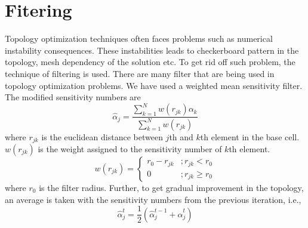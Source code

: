 \documentclass[openright,twoside]{iitkthesis}
\begin{document}
\section{Fitering}
Topology optimization techniques often faces problems such as numerical instability consequences. These instabilities leads to checkerboard pattern in the topology, mesh dependency of the solution etc. To get rid off such problem, the technique of filtering is used. There are many filter that are being used in topology optimization problems. We have used a weighted mean sensitivity filter. The modified sensitivity numbers are 
\begin{equation}
\label{eq:wmfilter}
\hat\alpha_j = \frac{\sum_{k=1}^{N}w(r_{jk})\alpha_k}{\sum_{k=1}^Nw(r_{jk})}
\end{equation}
where $r_{jk}$ is the euclidean distance between $j$th and $k$th element in the base cell. $w(r_{jk})$ is the weight assigned to the sensitivity number of $k$th element.
\begin{equation}
w(r_{jk}) = 
\begin{cases}
r_0 - r_{jk} &; r_{jk}<r_0\\
0 &; r_{jk}\geq r_0
\end{cases}
\end{equation}
where $r_0$ is the filter radius. 
Further, to get gradual improvement in the topology, an average is taken with the sensitivity numbers from the previous iteration, i.e.,
\begin{equation}
\hat\alpha^t_j = \frac{1}{2}(\hat\alpha^{t-1}_j+\hat\alpha^t_j)
\end{equation}
\end{document}
